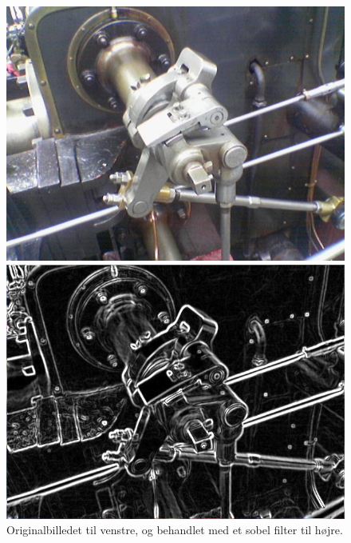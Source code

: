 \begin{figure}[H]
	\begin{minipage}[b]{0.5\linewidth}
		\centering
		\includegraphics[scale=0.25]{files/premethod/img/sobel1.PNG}
	\end{minipage}
	\hspace{0.5cm}
	\begin{minipage}[b]{0.5\linewidth}
		\centering
		\includegraphics[scale=0.25]{files/premethod/img/sobel2.PNG}
	\end{minipage}
	\caption{Originalbilledet til venstre, og behandlet med et sobel filter til højre.\label{fig:premethod_sobelres}}
\end{figure}

